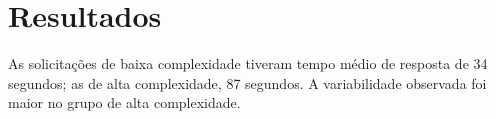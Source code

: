 \section{Resultados}
As solicitações de baixa complexidade tiveram tempo médio de resposta de 34 segundos; as de alta complexidade, 87 segundos.
A variabilidade observada foi maior no grupo de alta complexidade.
